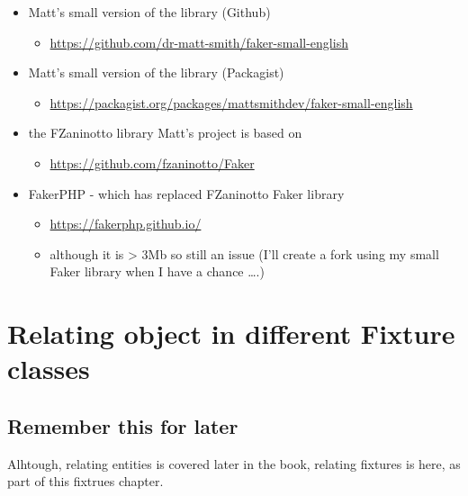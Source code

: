 \documentclass[a4paperpaper,openright]{book}
\providecommand{\tightlist}{%
  \setlength{\itemsep}{0pt}\setlength{\parskip}{0pt}}
\begin{document}
\begin{itemize}
\item
  Matt's small version of the library (Github)

  \begin{itemize}
  \tightlist
  \item
    \url{https://github.com/dr-matt-smith/faker-small-english}
  \end{itemize}
\item
  Matt's small version of the library (Packagist)

  \begin{itemize}
  \tightlist
  \item
    \url{https://packagist.org/packages/mattsmithdev/faker-small-english}
  \end{itemize}
\item
  the FZaninotto library Matt's project is based on

  \begin{itemize}
  \tightlist
  \item
    \url{https://github.com/fzaninotto/Faker}
  \end{itemize}
\item
  FakerPHP - which has replaced FZaninotto Faker library

  \begin{itemize}
  \tightlist
  \item
    \url{https://fakerphp.github.io/}
  \item
    although it is \textgreater{} 3Mb so still an issue (I'll create a
    fork using my small Faker library when I have a chance \ldots{}.)
  \end{itemize}
\end{itemize}

\hypertarget{relating-object-in-different-fixture-classes}{%
\chapter{\texorpdfstring{Relating object in different Fixture
classes\label{chapter_related_fixtures}}{Relating object in different Fixture classes}}\label{relating-object-in-different-fixture-classes}}

\hypertarget{remember-this-for-later}{%
\section{Remember this for later}\label{remember-this-for-later}}

Alhtough, relating entities is covered later in the book, relating
fixtures is here, as part of this fixtrues chapter.
\end{document}
